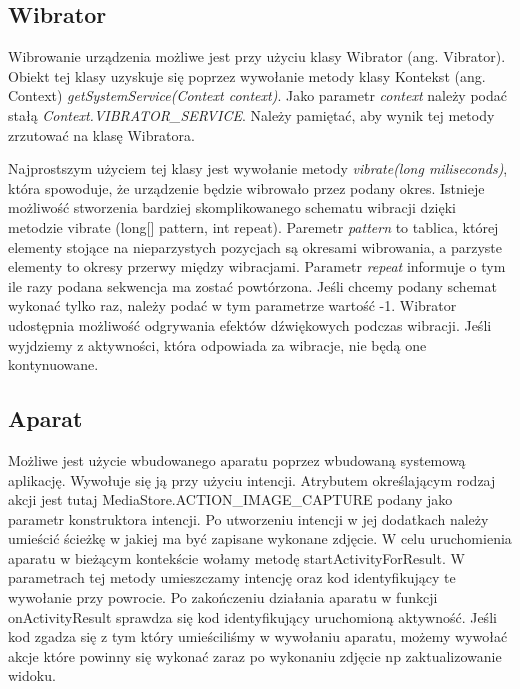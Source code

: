 \subsection{Wibrator}
Wibrowanie urządzenia możliwe jest przy użyciu klasy Wibrator (ang. Vibrator). Obiekt tej klasy uzyskuje się poprzez wywołanie metody klasy Kontekst (ang. Context) \textit{getSystemService(Context context)}. Jako parametr \textit{context} należy podać stałą \textit{Context.VIBRATOR\_SERVICE}. Należy pamiętać, aby wynik tej metody zrzutować na klasę Wibratora.\par Najprostszym użyciem tej klasy jest wywołanie metody \textit{vibrate(long miliseconds)}, która spowoduje, że urządzenie będzie wibrowało przez podany okres. Istnieje możliwość stworzenia bardziej skomplikowanego schematu wibracji dzięki metodzie vibrate (long[] pattern, int repeat). Paremetr \textit{pattern} to tablica, której elementy stojące na nieparzystych pozycjach są okresami wibrowania, a parzyste elementy to okresy przerwy między wibracjami. Parametr \textit{repeat} informuje o tym ile razy podana sekwencja ma zostać powtórzona. Jeśli chcemy podany schemat wykonać tylko raz, należy podać w tym parametrze wartość -1. Wibrator udostępnia możliwość odgrywania efektów dźwiękowych podczas wibracji. Jeśli wyjdziemy z aktywności, która odpowiada za wibracje, nie będą one kontynuowane.\cite{vibrator}
\subsection{Aparat}

Możliwe jest użycie wbudowanego aparatu poprzez wbudowaną systemową aplikację. Wywołuje się ją przy użyciu intencji. Atrybutem określającym rodzaj akcji jest tutaj MediaStore.ACTION\_IMAGE\_CAPTURE podany jako parametr konstruktora intencji. Po utworzeniu intencji w jej dodatkach należy umieścić ścieżkę w jakiej ma być zapisane wykonane zdjęcie. W celu uruchomienia aparatu w bieżącym kontekście wołamy metodę startActivityForResult. W parametrach tej metody umieszczamy intencję oraz kod identyfikujący te wywołanie przy powrocie. Po zakończeniu działania aparatu w funkcji onActivityResult sprawdza się kod identyfikujący uruchomioną aktywność. Jeśli kod zgadza się z tym który umieściliśmy w wywołaniu aparatu, możemy wywołać akcje które powinny się wykonać zaraz po wykonaniu zdjęcie np zaktualizowanie widoku.
